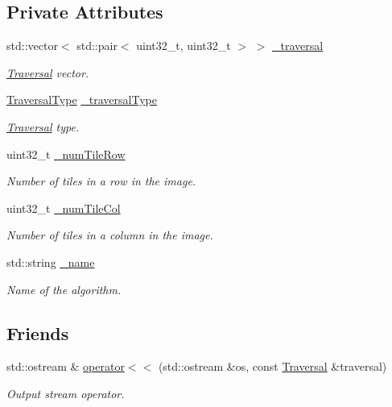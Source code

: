 \subsection*{Private Attributes}
\begin{DoxyCompactItemize}
\item 
std\+::vector$<$ std\+::pair$<$ uint32\+\_\+t, uint32\+\_\+t $>$ $>$ \hyperlink{classfi_1_1Traversal_abbf52b87c2d169d3359fcf440d916aab}{\+\_\+traversal}
\begin{DoxyCompactList}\small\item\em \hyperlink{classfi_1_1Traversal}{Traversal} vector. \end{DoxyCompactList}\item 
\hyperlink{namespacefi_a7ba5ce68668e7f273b22e5f56ca6dfcb}{Traversal\+Type} \hyperlink{classfi_1_1Traversal_a5c057650bf7806bb4af697b3c6a2aac0}{\+\_\+traversal\+Type}
\begin{DoxyCompactList}\small\item\em \hyperlink{classfi_1_1Traversal}{Traversal} type. \end{DoxyCompactList}\item 
uint32\+\_\+t \hyperlink{classfi_1_1Traversal_a016eee999dea6324d1862544b77456e2}{\+\_\+num\+Tile\+Row}
\begin{DoxyCompactList}\small\item\em Number of tiles in a row in the image. \end{DoxyCompactList}\item 
uint32\+\_\+t \hyperlink{classfi_1_1Traversal_a18d5f35cd062bda819c265ab6b1c681f}{\+\_\+num\+Tile\+Col}
\begin{DoxyCompactList}\small\item\em Number of tiles in a column in the image. \end{DoxyCompactList}\item 
std\+::string \hyperlink{classfi_1_1Traversal_ab23be4e2267a72da9c7e8f51c1dea79a}{\+\_\+name}
\begin{DoxyCompactList}\small\item\em Name of the algorithm. \end{DoxyCompactList}\end{DoxyCompactItemize}
\subsection*{Friends}
\begin{DoxyCompactItemize}
\item 
std\+::ostream \& \hyperlink{classfi_1_1Traversal_a3d8a47748a3e073d8f0d91ad4ce2f880}{operator$<$$<$} (std\+::ostream \&os, const \hyperlink{classfi_1_1Traversal}{Traversal} \&traversal)
\begin{DoxyCompactList}\small\item\em Output stream operator. \end{DoxyCompactList}\end{DoxyCompactItemize}


